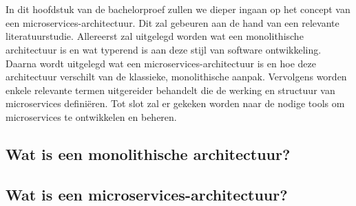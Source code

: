 \chapter{}%
\label{ch:stand-van-zaken}

In dit hoofdstuk van de bachelorproef zullen we dieper ingaan op het concept van een microservices-architectuur. Dit zal gebeuren aan de hand van een relevante literatuurstudie. Allereerst zal uitgelegd worden wat een monolithische architectuur is en wat typerend is aan deze stijl van software ontwikkeling. Daarna wordt uitgelegd wat een microservices-architectuur is en hoe deze architectuur verschilt van de klassieke, monolithische aanpak. Vervolgens worden enkele relevante termen uitgereider behandelt die de werking en structuur van microservices definiëren. Tot slot zal er gekeken worden naar de nodige tools om microservices te ontwikkelen en beheren.

\section{Wat is een monolithische architectuur?}

\section{Wat is een microservices-architectuur?}





